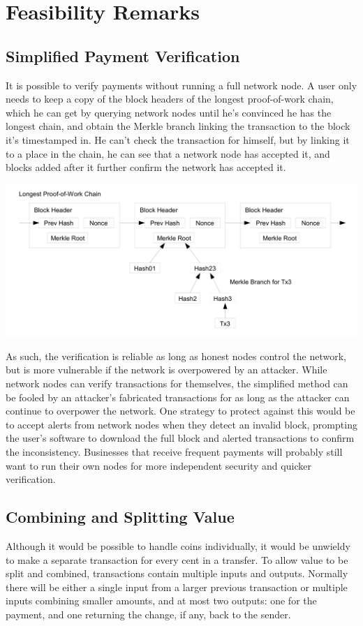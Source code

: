 \documentclass[10pt]{book}
\begin{document}
\part{Feasibility Remarks}
\chapter{Simplified Payment Verification}
It is possible to verify payments without running a full network node.
A user only needs to keep a copy of the block headers of the longest proof-of-work chain, which he can get by querying network nodes until he's convinced he has the longest chain, and obtain the Merkle branch linking the transaction to the block it's timestamped in.
He can't check the transaction for himself, but by linking it to a place in the chain, he can see that a network node has accepted it, and blocks added after it further confirm the network has accepted it.

\begin{center}
\includegraphics[width=1\textwidth]{./images/4.png}
\end{center}

As such, the verification is reliable as long as honest nodes control the network, but is more vulnerable if the network is overpowered by an attacker.
While network nodes can verify transactions for themselves, the simplified method can be fooled by an attacker's fabricated transactions for as long as the attacker can continue to overpower the network.
One strategy to protect against this would be to accept alerts from network nodes when they detect an invalid block, prompting the user's software to download the full block and alerted transactions to confirm the inconsistency.
Businesses that receive frequent payments will probably still want to run their own nodes for more independent security and quicker verification.

\chapter{Combining and Splitting Value}
Although it would be possible to handle coins individually, it would be unwieldy to make a separate transaction for every cent in a transfer.
To allow value to be split and combined, transactions contain multiple inputs and outputs.
Normally there will be either a single input from a larger previous transaction or multiple inputs combining smaller amounts, and at most two outputs: one for the payment, and one returning the change, if any, back to the sender.
\end{document}
